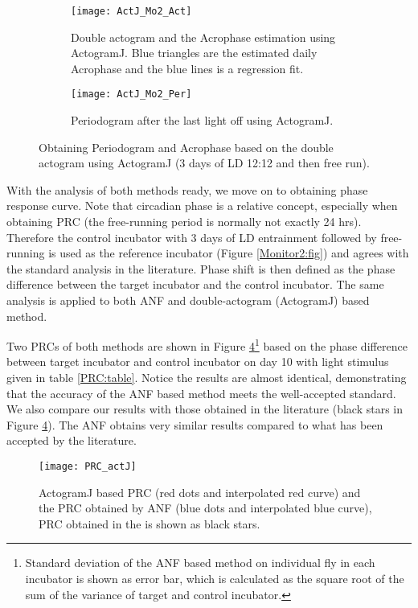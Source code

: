 \documentclass[11pt, onecolumn]{IEEEtran}
\begin{document}
\begin{figure}
        \centering
        \begin{subfigure}[t]{0.3\textwidth}
                \texttt{[image: ActJ\_Mo2\_Act]}
                \caption{Double actogram and the Acrophase estimation using ActogramJ. Blue triangles are the estimated daily Acrophase and the blue lines is a regression fit. \label{ActJ_Mo2_Act:fig}}
        \end{subfigure}
        \qquad
        \begin{subfigure}[t]{0.5\textwidth}
                \texttt{[image: ActJ\_Mo2\_Per]}
                \caption{Periodogram after the last light off using ActogramJ.\label{ActJ_Mo2_Per:fig}}
        \end{subfigure}
        \caption{Obtaining Periodogram and Acrophase based on the double actogram using ActogramJ (3 days of LD 12:12 and then free run).}
\end{figure}

With the analysis of both methods ready, we move on to obtaining phase response curve. Note that circadian phase is a relative concept, especially when obtaining PRC (the free-running period is normally not exactly 24 hrs). Therefore the control incubator with 3 days of LD entrainment followed by free-running is used as the reference incubator (Figure \ref{Monitor2:fig}) and agrees with the standard analysis in the literature. Phase shift is then defined as the phase difference between the target incubator and the control incubator. The same analysis is applied to both ANF and double-actogram (ActogramJ) based method.

Two PRCs of both methods are shown in Figure \ref{PRC_actJ:fig}\footnote{Standard deviation of the ANF based method on individual fly in each incubator is shown as error bar, which is calculated as the square root of the sum of the variance of target and control incubator.} based on the phase difference between target incubator and control incubator on day 10 with light stimulus given in table \ref{PRC:table}. Notice the results are almost identical, demonstrating that the accuracy of the ANF based method meets the well-accepted standard. We also compare our results with those obtained in the literature \cite{Klarsfeld03} (black stars in Figure \ref{PRC_actJ:fig}). The ANF obtains very similar results compared to what has been accepted by the literature.

\begin{figure}[ht]
\bc
  \texttt{[image: PRC\_actJ]}
\ec
  \caption{ActogramJ based PRC (red dots and interpolated red curve) and the PRC obtained by ANF (blue dots and interpolated blue curve), PRC obtained in the \cite{Klarsfeld03} is shown as black stars.\label{PRC_actJ:fig}}
\end{figure}
\end{document}

